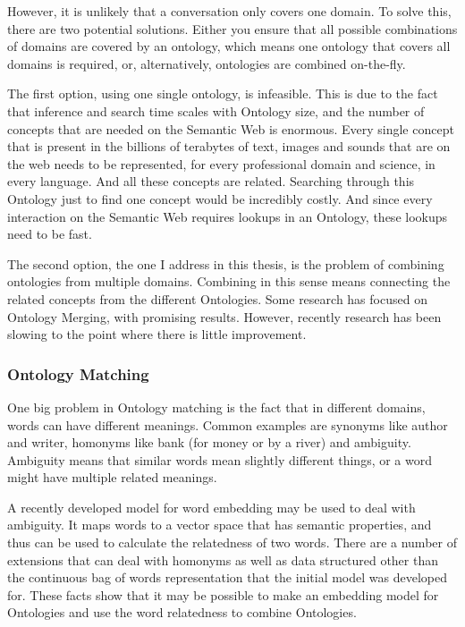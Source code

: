 \documentclass{article}
\begin{document}
 However, it is unlikely that a conversation only covers one domain. To solve this, there are two potential solutions. Either you ensure that all possible combinations of domains are covered by an ontology, which means one ontology that covers all domains is required, or, alternatively, ontologies are combined on-the-fly.
 
 The first option, using one single ontology, is infeasible. This is due to the fact that inference and search time scales with Ontology size, %
 and the number of concepts that are needed on the Semantic Web is enormous. Every single concept that is present in the billions of terabytes of text, images and sounds that are on the web needs to be represented, for every professional domain and science, in every language. And all these concepts are related. Searching through this Ontology just to find one concept would be incredibly costly. And since every interaction on the Semantic Web requires lookups in an Ontology, these lookups need to be fast.
 
 The second option, the one I address in this thesis, is the problem of combining ontologies from multiple domains. Combining in this sense means connecting the related concepts from the different Ontologies. Some research has focused on Ontology Merging, with promising results. However, recently research has been slowing to the point where there is little improvement.
 
 \subsubsection{Ontology Matching}
 One big problem in Ontology matching is the fact that in different domains, words can have different meanings. Common examples are synonyms like author and writer, homonyms like bank (for money or by a river) and ambiguity. Ambiguity means that similar words mean slightly different things, or a word might have multiple related meanings. %
 
 A recently developed model for word embedding may be used to deal with ambiguity. It maps words to a vector space that has semantic properties, and thus can be used to calculate the relatedness of two words. There are a number of extensions that can deal with homonyms as well as data structured other than the continuous bag of words representation that the initial model was developed for. These facts show that it may be possible to make an embedding model for Ontologies and use the word relatedness to combine Ontologies\cite{multisense}.
  
\end{document}
